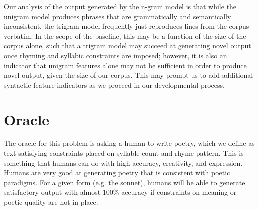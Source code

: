 \documentclass[10pt,twocolumn]{article}
\begin{document}
Our analysis of the output generated by the n-gram model is that while the unigram model produces phrases that are grammatically and semantically inconsistent, the trigram model frequently just reproduces lines from the corpus verbatim. In the scope of the baseline, this may be a function of the size of the corpus alone, such that a trigram model may succeed at generating novel output once rhyming and syllabic constraints are imposed; however, it is also an indicator that unigram features alone may not be sufficient in order to produce novel output, given the size of our corpus. This may prompt us to add additional syntactic feature indicators as we proceed in our developmental process.

\section{Oracle}
The oracle for this problem is asking a human to write poetry, which we define as text satisfying constraints placed on syllable count and rhyme pattern. This is something that humans can do with high accuracy, creativity, and expression. Humans are very good at generating poetry that is consistent with poetic paradigms. For a given form (e.g. the sonnet), humans will be able to generate satisfactory output with almost 100\% accuracy if constraints on meaning or poetic quality are not in place. 
\end{document}
